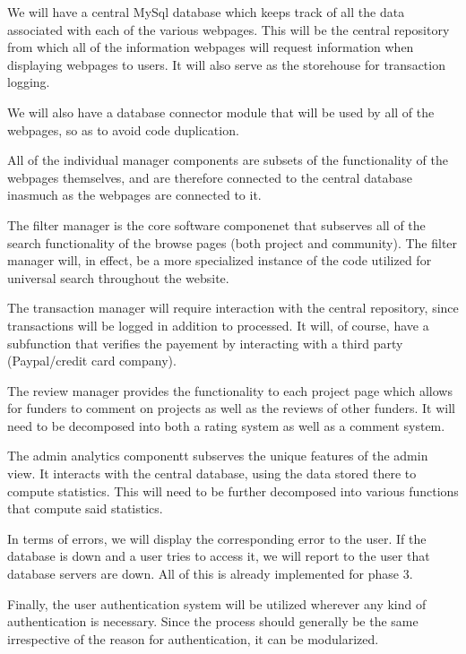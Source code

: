 \documentclass[12pt]{article}
\begin{document}
\begin{enumerate}
We will have a central MySql database which keeps track of all the data associated with each of the various webpages. This will be the central repository from which all of the information webpages will request information when displaying webpages to users. It will also serve as the storehouse for transaction logging.

We will also have a database connector module that will be used by all of the webpages, so as to avoid code duplication.

All of the individual manager components are subsets of the functionality of the webpages themselves, and are therefore connected to the central database inasmuch as the webpages are connected to it.

The filter manager is the core software componenet that subserves all of the search functionality of the browse pages (both project and community). The filter manager will, in effect, be a more specialized instance of the code utilized for universal search throughout the website.

The transaction manager will require interaction with the central repository, since transactions will be logged in addition to processed. It will, of course, have a subfunction that verifies the payement by interacting with a third party (Paypal/credit card company).

The review manager provides the functionality to each project page which allows for funders to comment on projects as well as the reviews of other funders. It will need to be decomposed into both a rating system as well as a comment system.

The admin analytics componentt subserves the unique features of the admin view. It interacts with the central database, using the data stored there to compute statistics. This will need to be further decomposed into various functions that compute said statistics.

In terms of errors, we will display the corresponding error to the user. If the database is down and a user tries to access it, we will report to the user that database servers are down. All of this is already implemented for phase 3.


Finally, the user authentication system will be utilized wherever any kind of authentication is necessary. Since the process should generally be the same irrespective of the reason for authentication, it can be modularized.



\end{enumerate}
\end{document}
